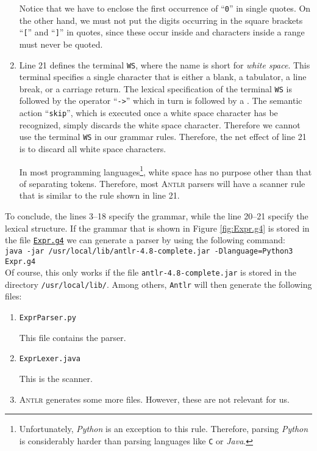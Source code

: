 \begin{enumerate}
      Notice that we have to enclose the first occurrence of ``\texttt{0}'' in single quotes.
      On the other hand, we must not put the digits occurring in the square brackets ``\texttt{[}'' 
      and ``\texttt{]}'' in quotes, since these occur inside  and characters inside a range
      must never be quoted.
\item Line 21 defines the terminal \texttt{WS}, where the name is short for \emph{white space}. This terminal
      specifies a single character that is either a blank, a tabulator, a line break, or a carriage return.
      The lexical specification of the terminal \texttt{WS} is followed by the operator ``\texttt{->}'' 
      which in turn is followed by a .
      The semantic action ``\texttt{skip}'', which is executed once a white space character has be recognized, 
      simply discards the white space character.  Therefore we cannot use the terminal \texttt{WS} in our
      grammar rules.  Therefore, the net effect of line 21 is to discard all white space characters.

      In most programming languages\footnote{
        Unfortunately, \textsl{Python} is an exception to this rule.  Therefore, parsing
        \textsl{Python} is considerably harder than parsing languages like \texttt{C} or \textsl{Java}.
      }, white space has no purpose other than that of separating  tokens.  
      Therefore, most \textsc{Antlr} parsers will have a scanner rule that is similar to
      the rule shown in line 21. 
\end{enumerate}
To conclude, the lines 3--18 specify the grammar, while the line 20--21 specify the 
lexical structure.  If the grammar that is shown in Figure \ref{fig:Expr.g4} is stored in the file
\href{https://github.com/karlstroetmann/Formal-Languages/blob/master/ANTLR4-Python/PureExprParser/Expr.g4}{\texttt{Expr.g4}} 
we can generate a parser by using the following command:
\\[0.2cm]
\hspace*{1.3cm}
\texttt{java -jar /usr/local/lib/antlr-4.8-complete.jar -Dlanguage=Python3 Expr.g4}
\\[0.2cm]
Of course, this only works if the file \texttt{antlr-4.8-complete.jar} is stored in the directory
\texttt{/usr/local/lib/}.  Among others, \texttt{Antlr} will then generate the following files:
\begin{enumerate}
\item \texttt{ExprParser.py}

      This file contains the parser.
\item \texttt{ExprLexer.java}

      This is the scanner.
\item \textsc{Antlr} generates some more files.  However, these are not relevant for us.
\end{enumerate}

